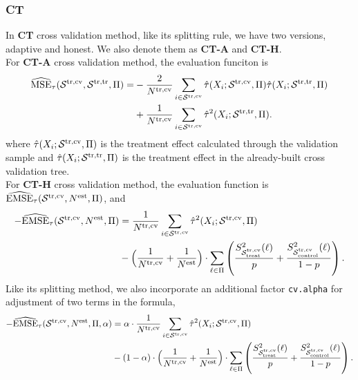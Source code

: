 \documentclass[11pt]{article}
\newcommand{\emse}{{\rm EMSE}}
\newcommand{\est}{{\rm est}}
\newcommand{\calp}{{\Pi}}
\newcommand{\cals}{{\cal S}}
\newcommand{\mse}{{\rm MSE}}
\newcommand{\control}{{\rm control}}
\newcommand{\treat}{{\rm treat}}
\newcommand{\train}{{\rm tr}}
\newcommand{\tcv}{{\rm cv}}
\begin{document}
\subsubsection{CT}
In \textbf{CT} cross validation method, like its splitting rule, we have two versions, adaptive and honest. We also denote them as \textbf{CT-A} and \textbf{CT-H}. \\
For \textbf{CT-A} cross validation method, the evaluation funciton is
\begin{align*}
\widehat{\mse}_\tau(\cals^{\train, \tcv},\cals^{\train, \train},\calp) =&
-\frac{2}{N^{\train, \tcv}}\sum_{i\in\cals^{\train, \tcv}}\hat\tau(X_i;\cals^{\train, \tcv},\calp)\hat\tau(X_i;\cals^{\train, \train},\calp)\\
& + \frac{1}{N^{\train, \tcv}}\sum_{i\in\cals^{\train, \tcv}}\hat\tau^2(
X_i;\cals^{\train, \train},\calp).
\end{align*}
where $\hat\tau(X_i;\cals^{\train, \tcv},\calp)$ is the treatment effect calculated through the validation sample and $\hat\tau(X_i;\cals^{\train, \train},\calp)$ is the treatment effect in the already-built cross validation tree.\\
For \textbf{CT-H} cross validation method, the evaluation function is $\widehat{\emse}_\tau(\cals^{\train, \tcv}, N^\est, \calp)$, and 
\begin{align*}
-\widehat{\emse}_\tau(\cals^{\train, \tcv}, N^\est, \calp) & = 
\frac{1}{N^{\train, \tcv}}\sum_{i\in\cals^{\train, \tcv}} \hat\tau^2(X_i;\cals^{\train, \tcv},\calp) \\
& -
\Bigl(\frac{1}{N^{\train, \tcv}} + \frac{1}{N^\est}\Bigr)\cdot \sum_{\ell\in\calp}
\left( \frac{S^2_{\cals^{\train, \tcv}_\treat}(\ell)}{p}+ \frac{S^2_{\cals^{\train, \tcv}_\control}(\ell)}{1-p}\right).
\end{align*}
Like its splitting method, we also incorporate an additional factor \texttt{cv.alpha} for adjustment of two terms in the formula,
\begin{align*}
-\widehat{\emse}_\tau(\cals^{\train, \tcv}, N^\est, \calp, \alpha) & = 
\alpha \cdot \frac{1}{N^{\train, \tcv}}\sum_{i\in\cals^{\train, \tcv}} \hat\tau^2(X_i;\cals^{\train, \tcv},\calp) \\
& - (1 - \alpha) \cdot
\Bigl(\frac{1}{N^{\train, \tcv}} + \frac{1}{N^\est}\Bigr)\cdot \sum_{\ell\in\calp}
\left( \frac{S^2_{\cals^{\train, \tcv}_\treat}(\ell)}{p}+ \frac{S^2_{\cals^{\train, \tcv}_\control}(\ell)}{1-p}\right).
\end{align*}
\end{document}
